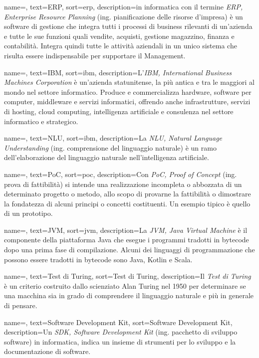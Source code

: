 {
    name=,
    text=ERP,
    sort=erp,
    description={in informatica con il termine \emph{ERP, Enterprise Resource Planning} (ing. pianificazione delle risorse d'impresa) è un software di gestione che integra tutti i processi di business rilevanti di un'azienda e tutte le sue funzioni quali vendite, acquisti, gestione magazzino, finanza e contabilità. Integra quindi tutte le attività aziendali in un unico sistema che risulta essere indispensabile per supportare il Management.}
}

{
	name=,
	text=IBM,
	sort=ibm,
	description={L'\emph{IBM, International Business Machines Corporation} è un'azienda statunitense, la più antica e tra le maggiori al mondo nel settore informatico. Produce e commercializza hardware, software per computer, middleware e servizi informatici, offrendo anche infrastrutture, servizi di hosting, cloud computing, intelligenza artificiale e consulenza nel settore informatico e strategico.}
}

{
	name=,
	text=NLU,
	sort=ibm,
	description={La \emph{NLU, Natural Language Understanding} (ing. comprensione del linguaggio naturale) è un ramo dell'elaborazione del linguaggio naturale nell'intelligenza artificiale.}
}

{
	name=,
	text=PoC,
	sort=poc,
	description={Con \emph{PoC, Proof of Concept} (ing. prova di fattibilità) si intende una realizzazione incompleta o abbozzata di un determinato progetto o metodo, allo scopo di provarne la fattibilità o dimostrare la fondatezza di alcuni principi o concetti costituenti. Un esempio tipico è quello di un prototipo.}
}

{
	name=,
	text=JVM,
	sort=jvm,
	description={La \emph{JVM, Java Virtual Machine} è il componente della piattaforma Java che esegue i programmi tradotti in bytecode dopo una prima fase di compilazione. Alcuni dei linguaggi di programmazione che possono essere tradotti in bytecode sono Java, Kotlin e Scala.}
}

{
	name=,
	text=Test di Turing,
	sort=Test di Turing,
	description={Il \emph{Test di Turing} è un criterio costruito dallo scienziato Alan Turing nel 1950 per determinare se una macchina sia in grado di comprendere il linguaggio naturale e più in generale di pensare.}
}

{
	name=,
	text=Software Development Kit,
	sort=Software Development Kit,
	description={Un \emph{SDK, Software Development Kit} (ing. pacchetto di sviluppo software) in informatica, indica un insieme di strumenti per lo sviluppo e la documentazione di software.}
}

